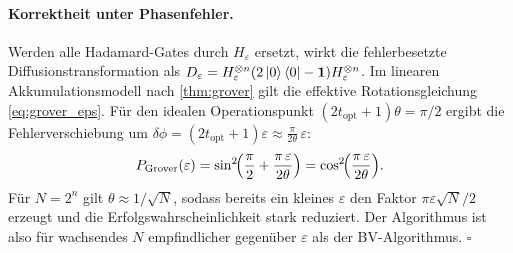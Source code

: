 ﻿\documentclass[11pt,a4paper]{article}
\theoremstyle{definition}
\newcommand{\eps}{\varepsilon}
\begin{document}
\paragraph{Korrektheit unter Phasenfehler.}
Werden alle Hadamard-Gates durch $H_\varepsilon$ ersetzt, wirkt die
fehlerbesetzte Diffusionstransformation als
$D_\varepsilon = H_\varepsilon^{\otimes n}(2\ket{0}\bra{0}-\mathbf{1})H_\varepsilon^{\otimes n}$.
Im linearen Akkumulationsmodell nach \cref{thm:grover} gilt die effektive
Rotationsgleichung \eqref{eq:grover_eps}.  Für den idealen Operationspunkt
$(2t_{\mathrm{opt}}+1)\theta = \pi/2$ ergibt die Fehlerverschiebung
um $\delta\phi = (2t_{\mathrm{opt}}+1)\eps \approx \frac{\pi}{2\theta}\,\eps$:
\[
  P_{\mathrm{Grover}}(\eps)
  = \sin^2\!\Bigl(\frac{\pi}{2} + \frac{\pi\,\eps}{2\theta}\Bigr)
  = \cos^2\!\Bigl(\frac{\pi\,\eps}{2\theta}\Bigr).
\]
Für $N=2^n$ gilt $\theta\approx 1/\sqrt{N}$, sodass bereits ein kleines
$\eps$ den Faktor $\pi\eps\sqrt{N}/2$ erzeugt und die Erfolgswahrscheinlichkeit
stark reduziert.  Der Algorithmus ist also für wachsendes $N$ empfindlicher
gegenüber $\eps$ als der BV-Algorithmus.  $\square$
\end{document}
